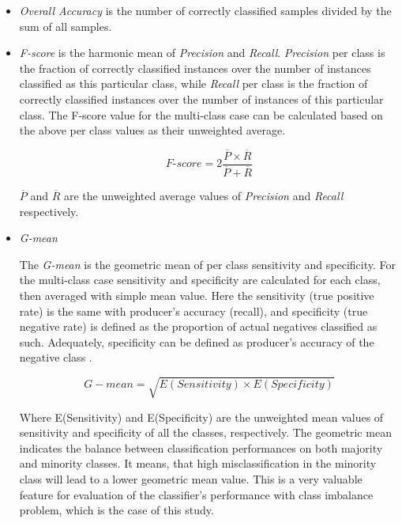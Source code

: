 \documentclass[remotesensing,article,submit,moreauthors,pdftex]{Definitions/mdpi}
\begin{document}
\begin{itemize}

	\renewcommand\labelitemi{--}

	\item \textit{Overall Accuracy} is the number of correctly classified samples
	divided by the sum of all samples.


	\item \textit{F-score} is the harmonic mean of \textit{Precision} and
	\textit{Recall}. \textit{Precision} per class is the fraction of correctly
	classified instances over the number of instances classified as this
	particular class, while \textit{Recall} per class is the fraction of
	correctly classified instances over the number of instances of this
	particular class. The F-score value for the multi-class case can be
	calculated based on the above per class values as their
	unweighted average.

	\begin{equation}
	\textit{F-score}=2\frac{\overline{P} \times \overline{R}}{\overline{P} +
	\overline{R}}
	\end{equation}

	\( \overline{P} \) and \( \overline{R} \) are the unweighted average values
	of \textit{Precision} and \textit{Recall} respectively.

	\item \textit{G-mean}

	The \textit{G-mean} is the geometric mean of per class
	sensitivity and specificity. For the multi-class case sensitivity and
	specificity are calculated for each class, then averaged with simple mean
	value. Here the sensitivity (true positive rate) is the same with producer's
	accuracy (recall), and specificity (true negative rate) is defined as the
	proportion of actual negatives classified as such. Adequately, specificity
	can be defined as producer's accuracy of the negative class
	\cite{Silva2017}.

	\begin{equation}
	G{-}mean = \sqrt{E(Sensitivity) \times E(Specificity)}
	\end{equation}

	Where E(Sensitivity) and E(Specificity) are the unweighted mean values of
	sensitivity and specificity of all the classes, respectively. The geometric
	mean indicates the balance between classification performances on both
	majority and minority classes. It means, that high misclassification in the
	minority class will lead to a lower geometric mean value. This is a very
	valuable feature for evaluation of the classifier's performance with class
	imbalance problem, which is the case of this study.

\end{itemize}
\end{document}
